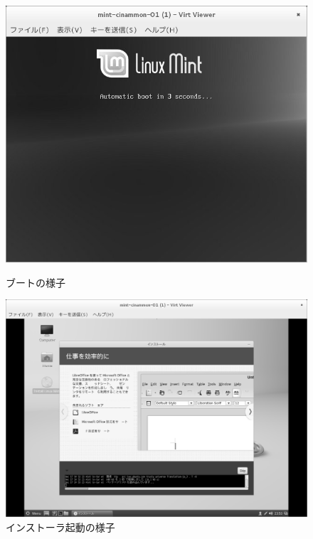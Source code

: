 \documentclass[mingoth,a4paper]{jsarticle}
\begin{document}
\begin{figure}[H]
\begin{minipage}{0.5\hsize}
\centering
\includegraphics[width=0.8\hsize]{image201412/mint-inst-boot_mono.png}
\caption{ブートの様子}\label{fig:mint-boot}
\end{minipage}
\begin{minipage}{0.5\hsize}
\centering
\includegraphics[width=0.8\hsize]{image201412/mint-inst_mono.png}
\caption{インストーラ起動の様子}\label{fig:mint-inst}
\end{minipage}
\end{figure}
\end{document}
